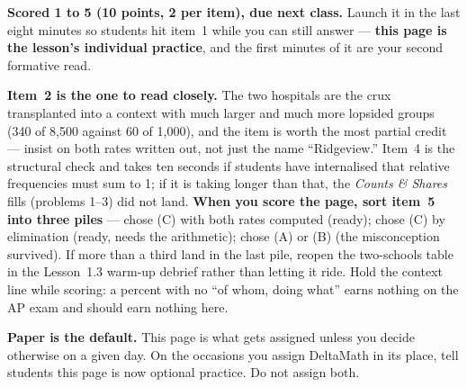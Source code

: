 \documentclass[10pt]{article}
\begin{document}
\begin{teachernote}[Homework]
\textbf{Scored 1 to 5 (10 points, 2 per item), due next class.} Launch it in the last eight minutes so
students hit item~1 while you can still answer --- \textbf{this page is the lesson's individual
practice}, and the first minutes of it are your second formative read.

\textbf{Item~2 is the one to read closely.} The two hospitals are the crux transplanted into a
context with much larger and much more lopsided groups (340 of 8,500 against 60 of 1,000), and
the item is worth the most partial credit --- insist on both rates written out, not just the
name ``Ridgeview.'' Item~4 is the structural check and takes ten seconds if students have
internalised that relative frequencies must sum to 1; if it is taking longer than that, the
\emph{Counts \& Shares} fills (problems 1--3) did not land. \textbf{When you score the page, sort item~5 into three piles} ---
chose (C) with both rates computed (ready); chose (C) by elimination (ready, needs the
arithmetic); chose (A) or (B) (the misconception survived). If more than a third land in the
last pile, reopen the two-schools table in the Lesson~1.3 warm-up debrief rather than letting it
ride. Hold the context line while scoring: a percent with no ``of whom, doing what'' earns
nothing on the AP exam and should earn nothing here.

\textbf{Paper is the default.} This page is what gets assigned unless you decide otherwise on a
given day. On the occasions you assign DeltaMath in its place, tell students this page is now optional practice. Do not assign both.
\end{teachernote}
\end{document}
